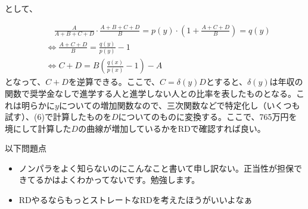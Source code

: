 \documentclass{jsarticle}
\begin{document}
	として、
	\par
	\begin{align}
	&\quad \frac{A}{A+B+C+D}\cdot \frac{A+B+C+D}{B} = p(y) \cdot (1 + \frac{A+C+D}{B}) = q(y) \nonumber \\[10pt]
	&\Leftrightarrow \frac{A+C+D}{B} = \frac{q(y)}{p(y)} -1 \nonumber\\[10pt]
	&\Leftrightarrow C+D = B\left(\frac{q(x)}{p(x)} - 1\right) - A
	\end{align}
	となって、$C+D$を逆算できる。ここで、$C = \delta(y) D$とすると、$\delta(y)$は年収の関数で奨学金なしで進学する人と進学しない人との比率を表したものとなる。これは明らかに$y$についての増加関数なので、三次関数などで特定化し（いくつも試す）、(6)で計算したものを$D$についてのものに変換する。ここで、765万円を境にして計算した$D$の曲線が増加しているかをRDで確認すれば良い。
	\par
	以下問題点
	\begin{itemize}
	\item ノンパラをよく知らないのにこんなこと書いて申し訳ない。正当性が担保できてるかはよくわかってないです。勉強します。
	\item RDやるならもっとストレートなRDを考えたほうがいいよなぁ
	\end{itemize}
	
\end{document}
